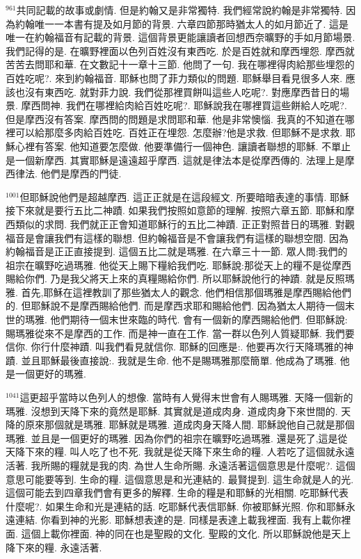 \documentclass{book}
\begin{document}
$^{961}$共同記載的故事或劇情.
但是約翰又是非常獨特.
我們經常說約翰是非常獨特.
因為約翰唯一一本書有提及如月節的背景.
六章四節那時猶太人的如月節近了.
這是唯一在約翰福音有記載的背景.
這個背景更能讓讀者回想西奈曠野的手如月節場景.
我們記得的是.
在曠野裡面以色列百姓沒有東西吃.
於是百姓就和摩西埋怨.
摩西就苦苦去問耶和華.
在文數記十一章十三節.
他問了一句.
我在哪裡得肉給那些埋怨的百姓吃呢?.
來到約翰福音.
耶穌也問了菲力類似的問題.
耶穌舉目看見很多人來.
應該也沒有東西吃.
就對菲力說.
我們從那裡買餅叫這些人吃呢?.
對應摩西昔日的場景.
摩西問神.
我們在哪裡給肉給百姓吃呢?.
耶穌說我在哪裡買這些餅給人吃呢?.
但是摩西沒有答案.
摩西問的問題是求問耶和華.
他是非常懊惱.
我真的不知道在哪裡可以給那麼多肉給百姓吃.
百姓正在埋怨.
怎麼辦?他是求救.
但耶穌不是求救.
耶穌心裡有答案.
他知道要怎麼做.
他要準備行一個神色.
讓讀者聯想的耶穌.
不單止是一個新摩西.
其實耶穌是遠遠超乎摩西.
這就是律法本是從摩西傳的.
法理上是摩西律法.
他們是摩西的門徒.

$^{1001}$但耶穌說他們是超越摩西.
這正正就是在這段經文.
所要暗暗表達的事情.
耶穌接下來就是要行五比二神蹟.
如果我們按照如意節的理解.
按照六章五節.
耶穌和摩西類似的求問.
我們就正正會知道耶穌行的五比二神蹟.
正正對照昔日的瑪雅.
對觀福音是會讓我們有這樣的聯想.
但約翰福音是不會讓我們有這樣的聯想空間.
因為約翰福音是正正直接提到.
這個五比二就是瑪雅.
在六章三十一節.
眾人問:我們的祖宗在曠野吃過瑪雅.
他從天上賜下糧給我們吃.
耶穌說:那從天上的糧不是從摩西賜給你們.
乃是我父將天上來的真糧賜給你們.
所以耶穌說他行的神蹟.
就是反照瑪雅.
首先,耶穌在這裡教訓了那些猶太人的觀念.
他們相信那個瑪雅是摩西賜給他們的.
但耶穌說不是摩西賜給他們.
而是摩西求耶和賜給他們.
因為猶太人期待一個末世的瑪雅.
他們期待一個末世來臨的時代.
會有一個新的摩西賜給他們.
但耶穌說:賜瑪雅從來不是摩西的工作.
而是神一直在工作.
當一群以色列人質疑耶穌.
我們要信你.
你行什麼神蹟.
叫我們看見就信你.
耶穌的回應是:.
他要再次行天降瑪雅的神蹟.
並且耶穌最後直接說:.
我就是生命.
他不是賜瑪雅那麼簡單.
他成為了瑪雅.
他是一個更好的瑪雅.

$^{1041}$這更超乎當時以色列人的想像.
當時有人覺得末世會有人賜瑪雅.
天降一個新的瑪雅.
沒想到天降下來的竟然是耶穌.
其實就是道成肉身.
道成肉身下來世間的.
天降的原來那個就是瑪雅.
耶穌就是瑪雅.
道成肉身天降人間.
耶穌說他自己就是那個瑪雅.
並且是一個更好的瑪雅.
因為你們的祖宗在曠野吃過瑪雅.
還是死了,這是從天降下來的糧.
叫人吃了也不死.
我就是從天降下來生命的糧.
人若吃了這個就永遠活著.
我所賜的糧就是我的肉.
為世人生命所賜.
永遠活著這個意思是什麼呢?.
這個意思可能要等到.
生命的糧.
這個意思是和光連結的.
最賢提到.
這生命就是人的光.
這個可能去到四章我們會有更多的解釋.
生命的糧是和耶穌的光相關.
吃耶穌代表什麼呢?.
如果生命和光是連結的話.
吃耶穌代表信耶穌.
你被耶穌光照.
你和耶穌永遠連結.
你看到神的光影.
耶穌想表達的是.
同樣是表達上載我裡面.
我有上載你裡面.
這個上載你裡面.
神的同在也是聖殿的文化.
聖殿的文化.
所以耶穌說他是天上降下來的糧.
永遠活著.
\end{document}
